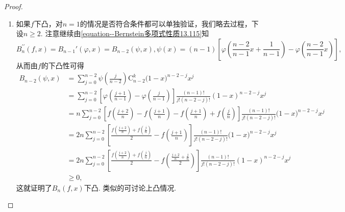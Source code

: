 \documentclass[../../main.tex]{subfiles}
\begin{document}
\begin{proof}
\begin{enumerate}[(1)]
\item 如果\(f\)下凸，对\(n = 1\)的情况是否符合条件都可以单独验证，我们略去过程，下设\(n\geqslant2\). 注意继续由\eqref{equation--Bernstein多项式性质13.115}知
\[B_n^{\prime\prime}(f,x)=B_{n - 1}'(\varphi,x)=B_{n - 2}(\psi,x),\psi(x)=(n - 1)\left[\varphi\left(\frac{n - 2}{n-1}x+\frac{1}{n-1}\right)-\varphi\left(\frac{n - 2}{n-1}x\right)\right],\]
从而由$f$的下凸性可得
\begin{align*}
B_{n - 2}(\psi,x)&=\sum_{j=0}^{n-2}{\psi \left( \frac{j}{n-2} \right) \mathrm{C}_{n-2}^{k}(1}-x)^{n-2-j}x^j
\\
&=\sum_{j = 0}^{n - 2}\left[\varphi\left(\frac{j + 1}{n - 1}\right)-\varphi\left(\frac{j}{n - 1}\right)\right]\frac{(n - 1)!}{j!(n - 2 - j)!}(1 - x)^{n - 2 - j}x^j
\\
&=n\sum_{j=0}^{n-2}{\left[ f\left( \frac{j+2}{n} \right) -f\left( \frac{j+1}{n} \right) -f\left( \frac{j+1}{n} \right) +f\left( \frac{j}{n} \right) \right] \frac{(n-1)!}{j!(n-2-j)!}(1}-x)^{n-2-j}x^j
\\
&=2n\sum_{j=0}^{n-2}{\left[ \frac{f\left( \frac{j+2}{n} \right) +f\left( \frac{j}{n} \right)}{2}-f\left( \frac{j+1}{n} \right) \right] \frac{(n-1)!}{j!(n-2-j)!}(1}-x)^{n-2-j}x^j
\\
&=2n\sum_{j = 0}^{n - 2}\left[\frac{f\left(\frac{j + 2}{n}\right)+f\left(\frac{j}{n}\right)}{2}-f\left(\frac{\frac{j + 2}{n}+\frac{j}{n}}{2}\right)\right]\frac{(n - 1)!}{j!(n - 2 - j)!}(1 - x)^{n - 2 - j}x^j
\\
&\geqslant0,
\end{align*}
这就证明了\(B_n(f,x)\)下凸. 类似的可讨论上凸情况.


\end{enumerate}
\end{proof}
\end{document}
